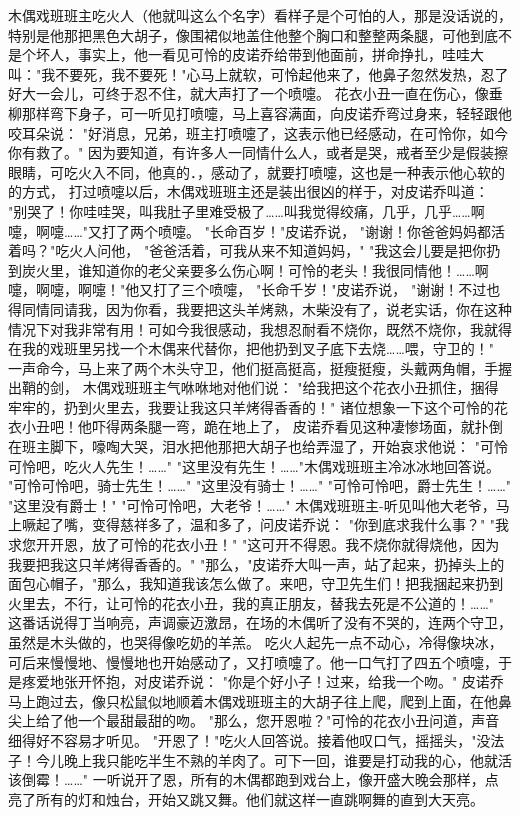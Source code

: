 \documentclass[12pt,UTF8]{ctexbook}
\begin{document}
木偶戏班班主吃火人（他就叫这么个名字）看样子是个可怕的人，那是没话说的，特别是他那把黑色大胡子，像围裙似地盖住他整个胸口和整整两条腿，可他到底不是个坏人，事实上，他一看见可怜的皮诺乔给带到他面前，拼命挣扎，哇哇大叫："我不要死，我不要死！"心马上就软，可怜起他来了，他鼻子忽然发热，忍了好大一会儿，可终于忍不住，就大声打了一个喷嚏。
花衣小丑一直在伤心，像垂柳那样弯下身子，可一听见打喷嚏，马上喜容满面，向皮诺乔弯过身来，轻轻跟他咬耳朵说：
"好消息，兄弟，班主打喷嚏了，这表示他已经感动，在可怜你，如今你有救了。"
因为要知道，有许多人一同情什么人，或者是哭，戒者至少是假装擦眼睛，可吃火入不同，他真的．，感动了，就要打喷嚏，这也是一种表示他心软的的方式，
打过喷嚏以后，木偶戏班班主还是装出很凶的样于，对皮诺乔叫道：
"别哭了！你哇哇哭，叫我肚子里难受极了……叫我觉得绞痛，几乎，几乎……啊嚏，啊嚏……"又打了两个喷嚏。
"长命百岁！"皮诺乔说，
"谢谢！你爸爸妈妈都活着吗？"吃火人问他，
"爸爸活着，可我从来不知道妈妈，"
"我这会儿要是把你扔到炭火里，谁知道你的老父亲要多么伤心啊！可怜的老头！我很同情他！……啊嚏，啊嚏，啊嚏！"他又打了三个喷嚏，
"长命千岁！"皮诺乔说，
"谢谢！不过也得同情同请我，因为你看，我要把这头羊烤熟，木柴没有了，说老实话，你在这种情况下对我非常有用！可如今我很感动，我想忍耐看不烧你，既然不烧你，我就得在我的戏班里另找一个木偶来代替你，把他扔到叉子底下去烧……喂，守卫的！"
一声命今，马上来了两个木头守卫，他们挺高挺高，挺瘦挺瘦，头戴两角帽，手握出鞘的剑，
木偶戏班班主气咻咻地对他们说：
"给我把这个花衣小丑抓住，捆得牢牢的，扔到火里去，我要让我这只羊烤得香香的！"
诸位想象一下这个可怜的花衣小丑吧！他吓得两条腿一弯，跪在地上了，
皮诺乔看见这种凄惨场面，就扑倒在班主脚下，嚎啕大哭，泪水把他那把大胡子也给弄湿了，开始哀求他说：
"可怜可怜吧，吃火人先生！……"
"这里没有先生！……"木偶戏班班主冷冰冰地回答说。
"可怜可怜吧，骑士先生！……"
"这里没有骑士！……"
"可怜可怜吧，爵士先生！……"
"这里没有爵士！"
"可怜可怜吧，大老爷！……"
木偶戏班班主-听见叫他大老爷，马上噘起了嘴，变得慈祥多了，温和多了，问皮诺乔说：
"你到底求我什么事？"
"我求您开开恩，放了可怜的花衣小丑！"
"这可开不得恩。我不烧你就得烧他，因为我要把我这只羊烤得香香的。"
"那么，"皮诺乔大叫一声，站了起来，扔掉头上的面包心帽子，"那么，我知道我该怎么做了。来吧，守卫先生们！把我捆起来扔到火里去，不行，让可怜的花衣小丑，我的真正朋友，替我去死是不公道的！……"
这番话说得丁当响亮，声调豪迈激昂，在场的木偶听了没有不哭的，连两个守卫，虽然是木头做的，也哭得像吃奶的羊羔。
吃火人起先一点不动心，冷得像块冰，可后来慢慢地、慢慢地也开始感动了，又打喷嚏了。他一口气打了四五个喷嚏，于是疼爱地张开怀抱，对皮诺乔说：
"你是个好小子！过来，给我一个吻。"
皮诺乔马上跑过去，像只松鼠似地顺着木偶戏班班主的大胡子往上爬，爬到上面，在他鼻尖上给了他一个最甜最甜的吻。
"那么，您开恩啦？"可怜的花衣小丑问道，声音细得好不容易才听见。
"开恩了！"吃火人回答说。接着他叹口气，摇摇头，"没法子！今儿晚上我只能吃半生不熟的羊肉了。可下一回，谁要是打动我的心，他就活该倒霉！……"
一听说开了恩，所有的木偶都跑到戏台上，像开盛大晚会那样，点亮了所有的灯和烛台，开始又跳又舞。他们就这样一直跳啊舞的直到大天亮。
\end{document}
